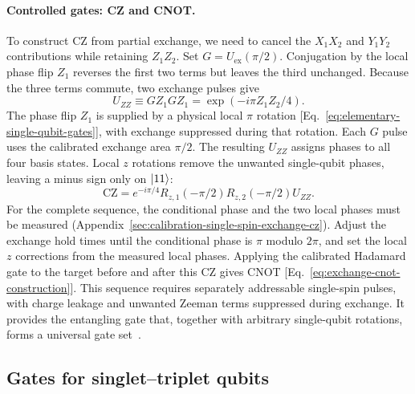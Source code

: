 \paragraph{Controlled gates: CZ and CNOT.}
To construct CZ from partial exchange, we need to cancel the
$X_1X_2$ and $Y_1Y_2$ contributions while retaining $Z_1Z_2$.
Set $G=U_{\mathrm{ex}}(\pi/2)$.
Conjugation by the local phase flip $Z_1$ reverses the first two
terms but leaves the third unchanged. Because the three terms
commute, two exchange pulses give
\begin{equation}
  U_{ZZ}\equiv G Z_1 G Z_1
       =\exp(-i\pi Z_1Z_2/4).
  \label{eq:exchange-zz-construction}
\end{equation}
The phase flip $Z_1$ is supplied by a physical local $\pi$ rotation
[Eq.~\eqref{eq:elementary-single-qubit-gates}], with exchange
suppressed during that rotation. Each $G$ pulse uses the calibrated
exchange area $\pi/2$.
The resulting $U_{ZZ}$ assigns phases to all four basis states.
Local $z$ rotations remove the unwanted single-qubit phases, leaving
a minus sign only on $\lvert 11\rangle$:
\begin{equation}
  \mathrm{CZ}
     =e^{-i\pi/4}R_{z,1}(-\pi/2)R_{z,2}(-\pi/2)U_{ZZ}.
  \label{eq:exchange-cz-construction}
\end{equation}
For the complete sequence, the conditional phase and the two local
phases must be measured
(Appendix~\ref{sec:calibration-single-spin-exchange-cz}). Adjust the
exchange hold times until the conditional phase is $\pi$ modulo
$2\pi$, and set the local $z$ corrections from the measured local
phases.
Applying the calibrated Hadamard gate to the target before and
after this CZ gives CNOT [Eq.~\eqref{eq:exchange-cnot-construction}].
This sequence requires separately addressable single-spin pulses,
with charge leakage and unwanted Zeeman terms suppressed during
exchange. It provides the entangling gate that, together with
arbitrary single-qubit rotations, forms a universal gate
set~\cite{Loss1998}.

\subsection{Gates for singlet--triplet qubits}
\label{sec:st-gates}

